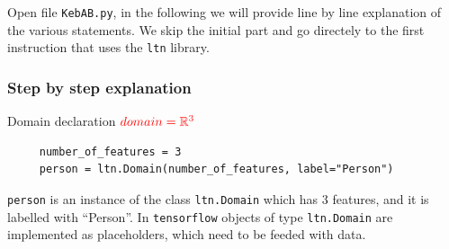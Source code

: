 \documentclass[xcolor=pdftex,dvipsnames,table]{beamer}
\def\R{\mathbb{R}}
\begin{document}
\begin{frame}
Open file \texttt{KebAB.py}, in the following we will provide line by
line explanation of the various statements. We skip the initial part
and go directely to the first instruction that uses the \texttt{ltn}
library. 
\end{frame}

\begin{frame}[containsverbatim]
\frametitle{Step by step explanation}
    \begin{block}{Domain declaration}
      $ \color{red} domain = \R^3$
    \begin{lstlisting}
     number_of_features = 3
     person = ltn.Domain(number_of_features, label="Person")
   \end{lstlisting}
     \texttt{person} is an instance of the class \texttt{ltn.Domain}
     which has 3 features, and it is labelled with ``Person''. In
     \texttt{tensorflow} objects of type \texttt{ltn.Domain} are
     implemented as placeholders, which need to be feeded with data. 
   \end{block}
 \end{frame}
\end{document}
